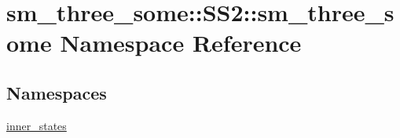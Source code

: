 \hypertarget{namespacesm__three__some_1_1SS2_1_1sm__three__some}{}\section{sm\+\_\+three\+\_\+some\+:\+:S\+S2\+:\+:sm\+\_\+three\+\_\+some Namespace Reference}
\label{namespacesm__three__some_1_1SS2_1_1sm__three__some}
\subsection*{Namespaces}
\begin{DoxyCompactItemize}
\item 
 \hyperlink{namespacesm__three__some_1_1SS2_1_1sm__three__some_1_1inner__states}{inner\+\_\+states}
\end{DoxyCompactItemize}
